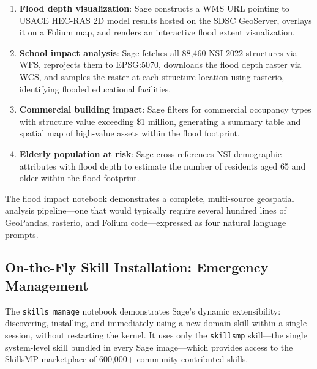 \documentclass[10pt,twocolumn]{article}
\begin{document}
\begin{enumerate}
  \item \textbf{Flood depth visualization}: Sage constructs a WMS URL pointing to USACE HEC-RAS 2D model results hosted on the SDSC GeoServer, overlays it on a Folium map, and renders an interactive flood extent visualization.
  \item \textbf{School impact analysis}: Sage fetches all 88,460 NSI 2022 structures via WFS, reprojects them to EPSG:5070, downloads the flood depth raster via WCS, and samples the raster at each structure location using rasterio, identifying flooded educational facilities.
  \item \textbf{Commercial building impact}: Sage filters for commercial occupancy types with structure value exceeding \$1 million, generating a summary table and spatial map of high-value assets within the flood footprint.
  \item \textbf{Elderly population at risk}: Sage cross-references NSI demographic attributes with flood depth to estimate the number of residents aged 65 and older within the flood footprint.
\end{enumerate}

The flood impact notebook demonstrates a complete, multi-source geospatial analysis pipeline---one that would typically require several hundred lines of GeoPandas, rasterio, and Folium code---expressed as four natural language prompts.

\subsection{On-the-Fly Skill Installation: Emergency Management}

The \texttt{skills\_manage} notebook demonstrates Sage's dynamic extensibility: discovering, installing, and immediately using a new domain skill within a single session, without restarting the kernel. It uses only the \texttt{skillsmp} skill---the single system-level skill bundled in every Sage image---which provides access to the SkillsMP marketplace of 600,000+ community-contributed skills.
\end{document}
